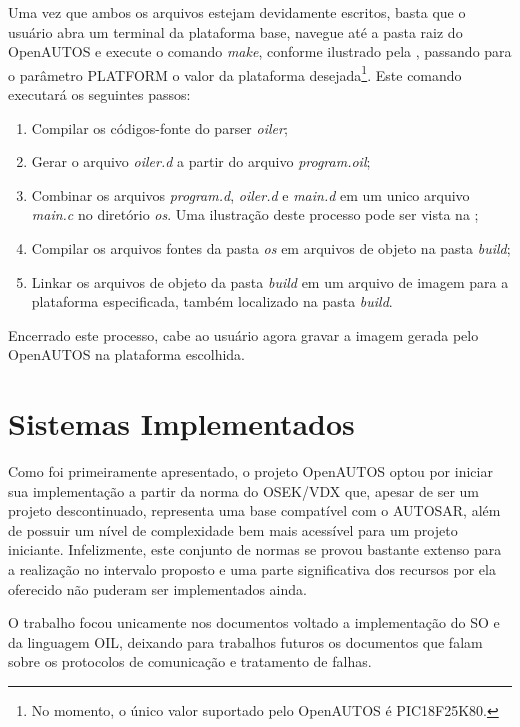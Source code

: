 Uma vez que ambos os arquivos estejam devidamente escritos, basta que o usuário abra um terminal da plataforma base, navegue até a pasta raiz do OpenAUTOS e execute o comando \emph{make}, conforme ilustrado pela , passando para o parâmetro PLATFORM o valor da plataforma desejada\footnote{No momento, o único valor suportado pelo OpenAUTOS é PIC18F25K80.}. Este comando executará os seguintes passos:

\begin{enumerate}
	\item Compilar os códigos-fonte do parser \emph{oiler};
	\item Gerar o arquivo \emph{oiler.d} a partir do arquivo \emph{program.oil};
	\item Combinar os arquivos \emph{program.d}, \emph{oiler.d} e \emph{main.d} em um unico arquivo \emph{main.c} no diretório \emph{os}. Uma ilustração deste processo pode ser vista na ;
	\item Compilar os arquivos fontes da pasta \emph{os} em arquivos de objeto na pasta \emph{build};
	\item Linkar os arquivos de objeto da pasta \emph{build} em um arquivo de imagem para a plataforma especificada, também localizado na pasta \emph{build}.
\end{enumerate}



Encerrado este processo, cabe ao usuário agora gravar a imagem gerada pelo OpenAUTOS na plataforma escolhida.

\section{Sistemas Implementados}

Como foi primeiramente apresentado, o projeto OpenAUTOS optou por iniciar sua implementação a partir da norma do OSEK/VDX que, apesar de ser um projeto descontinuado, representa uma base compatível com o AUTOSAR, além de possuir um nível de complexidade bem mais acessível para um projeto iniciante. Infelizmente, este conjunto de normas se provou bastante extenso para a realização no intervalo proposto e uma parte significativa dos recursos por ela oferecido não puderam ser implementados ainda.

O trabalho focou unicamente nos documentos voltado a implementação do SO e da linguagem OIL, deixando para trabalhos futuros os documentos que falam sobre os protocolos de comunicação e tratamento de falhas.

